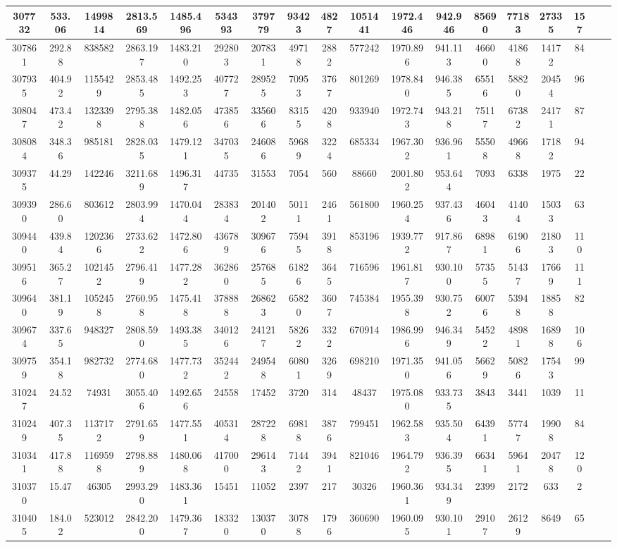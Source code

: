 \documentclass[10pt]{extarticle}
\begin{document}
\begin{longtable}{|c|c|c|c|c|c|c|c|c|c|c|c|c|c|c|c|c|c|}
\hline 
307732&533.06&1499814&2813.569&1485.496&534393&379779&93423&4827&1051441&1972.446&942.946&85690&77183&27335&157 \\ 
\hline 
307861&292.88&838582&2863.197&1483.210&292803&207831&49718&2882&577242&1970.896&941.113&46600&41868&14172&84 \\ 
\hline 
307935&404.92&1155429&2853.485&1492.253&407727&289525&70953&3767&801269&1978.840&946.385&65516&58820&20454&96 \\ 
\hline 
308047&473.42&1323398&2795.388&1482.056&473856&335606&83155&4208&933940&1972.743&943.218&75117&67382&24171&87 \\ 
\hline 
308084&348.36&985181&2828.035&1479.121&347035&246086&59689&3224&685334&1967.302&936.961&55508&49668&17182&94 \\ 
\hline 
309375&44.29&142246&3211.689&1496.317&44735&31553&7054&560&88660&2001.802&953.644&7093&6338&1975&22 \\ 
\hline 
309390&286.60&803612&2803.994&1470.044&283834&201402&50111&2461&561800&1960.254&937.436&46043&41404&15033&63 \\ 
\hline 
309440&439.84&1202366&2733.622&1472.806&436789&309676&75945&3918&853196&1939.772&917.867&68981&61906&21803&110 \\ 
\hline 
309516&365.27&1021452&2796.419&1477.282&362860&257685&61826&3645&716596&1961.817&930.100&57355&51437&17669&111 \\ 
\hline 
309640&381.19&1052458&2760.958&1475.418&378888&268623&65820&3607&745384&1955.398&930.752&60076&53948&18858&82 \\ 
\hline 
309674&337.65&948327&2808.590&1493.385&340126&241217&58262&3322&670914&1986.996&946.349&54522&48981&16898&106 \\ 
\hline 
309759&354.18&982732&2774.680&1477.732&352442&249548&60801&3269&698210&1971.350&941.056&56629&50826&17543&99 \\ 
\hline 
310247&24.52&74931&3055.406&1492.656&24558&17452&3720&314&48437&1975.080&933.735&3843&3441&1039&11 \\ 
\hline 
310249&407.35&1137172&2791.659&1477.551&405314&287228&69818&3876&799451&1962.583&935.504&64391&57747&19908&84 \\ 
\hline 
310341&417.88&1169598&2798.889&1480.068&417000&296143&71442&3941&821046&1964.792&936.395&66341&59641&20478&120 \\ 
\hline 
310370&15.47&46305&2993.290&1483.361&15451&11052&2397&217&30326&1960.361&934.349&2399&2172&633&2 \\ 
\hline 
310405&184.02&523012&2842.200&1479.367&183320&130370&30788&1796&360690&1960.095&930.101&29107&26129&8649&65 \\ 

\end{longtable}
\end{document}

